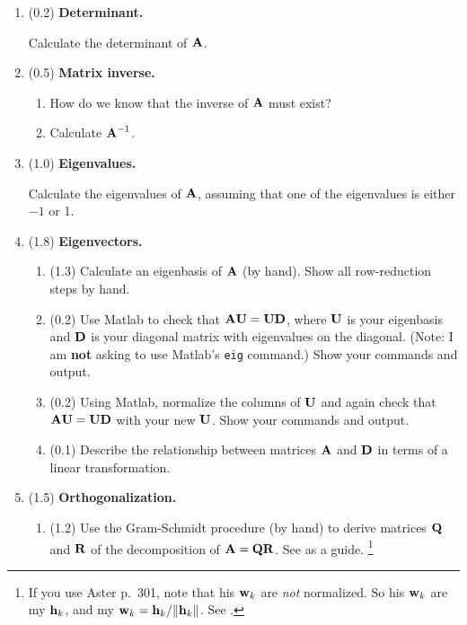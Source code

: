 \begin{enumerate}
\item (0.2) {\bf Determinant.}

Calculate the determinant of $\mbox{${\bf A}$}$.

\item (0.5) {\bf Matrix inverse.}

\begin{enumerate}
\item How do we know that the inverse of $\mbox{${\bf A}$}$ must exist?
\item Calculate $\mbox{${\bf A}$}^{-1}$.
\end{enumerate}

\item (1.0) {\bf Eigenvalues.}

Calculate the eigenvalues of $\mbox{${\bf A}$}$, assuming that one of the eigenvalues is either $-1$ or 1.

\item (1.8) {\bf Eigenvectors.}

\begin{enumerate}
\item (1.3) Calculate an eigenbasis of $\mbox{${\bf A}$}$ (by hand). Show all row-reduction steps by hand.

\item (0.2) Use Matlab to check that $\mbox{${\bf A}$}\mbox{${\bf U}$} = \mbox{${\bf U}$}\mbox{${\bf D}$}$, where $\mbox{${\bf U}$}$ is your eigenbasis and $\mbox{${\bf D}$}$ is your diagonal matrix with eigenvalues on the diagonal. (Note: I am {\bf not} asking to use Matlab's \verb+eig+ command.) Show your commands and output.

\item (0.2) Using Matlab, normalize the columns of $\mbox{${\bf U}$}$ and again check that $\mbox{${\bf A}$}\mbox{${\bf U}$} = \mbox{${\bf U}$}\mbox{${\bf D}$}$ with your new $\mbox{${\bf U}$}$. Show your commands and output.

\item (0.1) Describe the relationship between matrices $\mbox{${\bf A}$}$ and $\mbox{${\bf D}$}$ in terms of a linear transformation.

\end{enumerate}

\pagebreak
\item (1.5) {\bf Orthogonalization.}

\begin{enumerate}
\item (1.2) Use the Gram-Schmidt procedure (by hand) to derive matrices $\mbox{${\bf Q}$}$ and $\mbox{${\bf R}$}$ of the decomposition of $\mbox{${\bf A}$} = \mbox{${\bf Q}$}\mbox{${\bf R}$}$. See  as a guide.
\footnote{If you use Aster p.~301, note that his $\mbox{${\bf w}$}_k$ are {\em not} normalized. So his $\mbox{${\bf w}$}_k$ are my $\mbox{${\bf h}$}_k$, and my $\mbox{${\bf w}$}_k = \mbox{${\bf h}$}_k/\|\mbox{${\bf h}$}_k\|$. See .}


\end{enumerate}
\end{enumerate}
